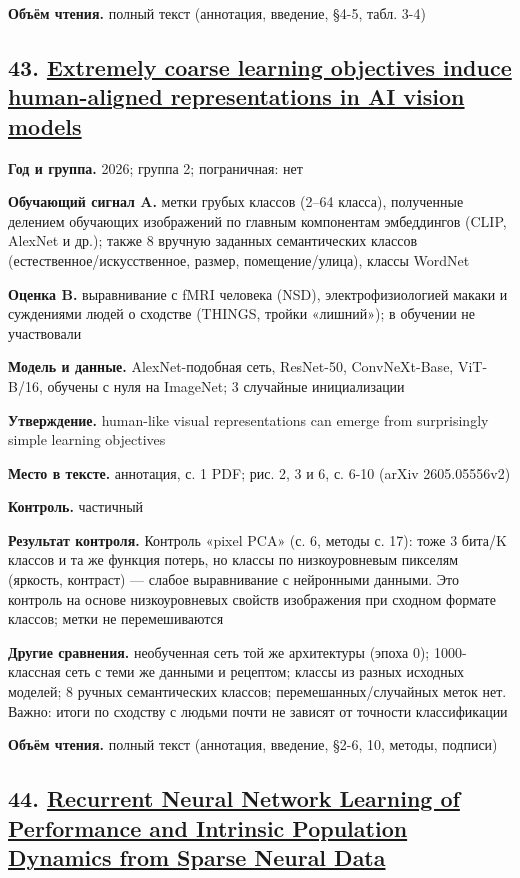\textbf{Объём чтения.} полный текст (аннотация, введение, §4-5, табл. 3-4)


\subsection*{43. \href{https://doi.org/10.21203/rs.3.rs-11089803/v1}{Extremely coarse learning objectives induce human-aligned representations in AI vision models}}

\textbf{Год и группа.} 2026; группа 2; пограничная: нет

\textbf{Обучающий сигнал A.} метки грубых классов (2–64 класса), полученные делением обучающих изображений по главным компонентам эмбеддингов (CLIP, AlexNet и др.); также 8 вручную заданных семантических классов (естественное/искусственное, размер, помещение/улица), классы WordNet

\textbf{Оценка B.} выравнивание с fMRI человека (NSD), электрофизиологией макаки и суждениями людей о сходстве (THINGS, тройки «лишний»); в обучении не участвовали

\textbf{Модель и данные.} AlexNet-подобная сеть, ResNet-50, ConvNeXt-Base, ViT-B/16, обучены с нуля на ImageNet; 3 случайные инициализации

\textbf{Утверждение.} human-like visual representations can emerge from surprisingly simple learning objectives

\textbf{Место в тексте.} аннотация, с. 1 PDF; рис. 2, 3 и 6, с. 6-10 (arXiv 2605.05556v2)

\textbf{Контроль.} частичный

\textbf{Результат контроля.} Контроль «pixel PCA» (с. 6, методы с. 17): тоже 3 бита/K классов и та же функция потерь, но классы по низкоуровневым пикселям (яркость, контраст) — слабое выравнивание с нейронными данными. Это контроль на основе низкоуровневых свойств изображения при сходном формате классов; метки не перемешиваются

\textbf{Другие сравнения.} необученная сеть той же архитектуры (эпоха 0); 1000-классная сеть с теми же данными и рецептом; классы из разных исходных моделей; 8 ручных семантических классов; перемешанных/случайных меток нет. Важно: итоги по сходству с людьми почти не зависят от точности классификации

\textbf{Объём чтения.} полный текст (аннотация, введение, §2-6, 10, методы, подписи)


\subsection*{44. \href{https://doi.org/10.1007/978-3-030-61609-0_69}{Recurrent Neural Network Learning of Performance and Intrinsic Population Dynamics from Sparse Neural Data}}

